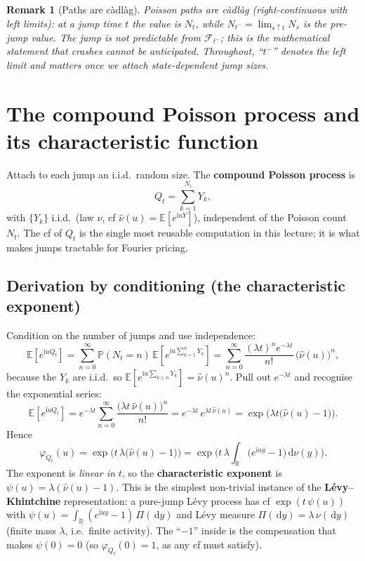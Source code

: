 \documentclass[11pt]{article}
\newcommand{\R}{\mathbb{R}}
\newcommand{\E}{\mathbb{E}}
\newcommand{\ii}{\mathrm{i}}
\newcommand{\dd}{\,\mathrm{d}}
\newcommand{\ch}{\varphi}
\newtheorem{remark}{Remark}
\begin{document}
\begin{remark}[Paths are c\`adl\`ag]
Poisson paths are \emph{c\`adl\`ag} (right-continuous with left limits): at a jump time $t$ the value
is $N_t$, while $N_{t^-}=\lim_{s\uparrow t}N_s$ is the pre-jump value. The jump is not predictable from
$\mathcal F_{t^-}$; this is the mathematical statement that crashes cannot be anticipated. Throughout,
``$t^-$'' denotes the left limit and matters once we attach state-dependent jump sizes.
\end{remark}

\section{The compound Poisson process and its characteristic function}\label{sec:cpp}
Attach to each jump an i.i.d.\ random size. The \textbf{compound Poisson process} is
\[
Q_t=\sum_{k=1}^{N_t} Y_k,
\]
with $\{Y_k\}$ i.i.d.\ (law $\nu$, cf $\widehat\nu(u)=\E[e^{\ii u Y}]$), independent of the Poisson
count $N_t$. The cf of $Q_t$ is the single most reusable computation in this lecture; it is what makes
jumps tractable for Fourier pricing.

\subsection{Derivation by conditioning (the characteristic exponent)}
Condition on the number of jumps and use independence:
\[
\E\!\left[e^{\ii u Q_t}\right]
=\sum_{n=0}^{\infty}\mathbb{P}(N_t=n)\,\E\!\left[e^{\ii u\sum_{k=1}^{n}Y_k}\right]
=\sum_{n=0}^{\infty}\frac{(\lambda t)^{n}e^{-\lambda t}}{n!}\,\big(\widehat\nu(u)\big)^{n},
\]
because the $Y_k$ are i.i.d.\ so $\E[e^{\ii u\sum_{k\le n}Y_k}]=\widehat\nu(u)^{n}$. Pull out $e^{-\lambda t}$
and recognise the exponential series:
\[
\E\!\left[e^{\ii u Q_t}\right]
=e^{-\lambda t}\sum_{n=0}^{\infty}\frac{\big(\lambda t\,\widehat\nu(u)\big)^{n}}{n!}
=e^{-\lambda t}\,e^{\lambda t\,\widehat\nu(u)}
=\exp\!\Big(\lambda t\big(\widehat\nu(u)-1\big)\Big).
\]
Hence
\begin{equation}\label{eq:cppcf}
\boxed{\;\ch_{Q_t}(u)=\exp\!\Big(t\,\lambda\big(\widehat\nu(u)-1\big)\Big)
       =\exp\!\Big(t\,\lambda\!\int_{\R}\big(e^{\ii u y}-1\big)\dd\nu(y)\Big).\;}
\end{equation}
The exponent is \emph{linear in $t$}, so the \textbf{characteristic exponent} is
$\psi(u)=\lambda(\widehat\nu(u)-1)$. This is the simplest non-trivial instance of the
\textbf{L\'evy--Khintchine} representation: a pure-jump L\'evy process has cf
$\exp(t\,\psi(u))$ with $\psi(u)=\int_{\R}(e^{\ii u y}-1)\,\Pi(\dd y)$ and L\'evy measure
$\Pi(\dd y)=\lambda\,\nu(\dd y)$ (finite mass $\lambda$, i.e.\ finite activity). The ``$-1$'' inside is the
compensation that makes $\psi(0)=0$ (so $\ch_{Q_t}(0)=1$, as any cf must satisfy).
\end{document}
